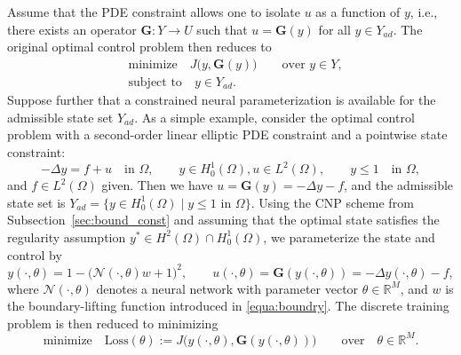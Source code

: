 \documentclass{article}
\numberwithin{equation}{section}
\begin{document}
Assume that the PDE constraint allows one to isolate $u$ as a function of $y$, i.e., there exists an operator $\mathbf{G}:Y\to U$ such that $u=\mathbf{G}(y)$ for all $y\in Y_{ad}$.
The original optimal control problem then reduces to
\begin{align*}
    &\text{minimize}\quad J\bigl(y,\mathbf{G}(y)\bigr)\qquad \text{over } y\in Y,\\
    &\text{subject to}\quad y\in Y_{ad}. 
\end{align*}
Suppose further that a constrained neural parameterization is available for the admissible state set $Y_{ad}$. As a simple example, consider the optimal control problem with a second-order linear elliptic PDE constraint and a pointwise state constraint:
\begin{equation}
    -\Delta y=f+u
    \quad \text{in }\Omega,
    \qquad
    y\in H^1_0(\Omega), u\in L^2(\Omega)
    ,
    \qquad
    y\le 1
    \quad \text{in }\Omega,
\end{equation}
and $f\in L^2(\Omega)$ given. Then we have $u=\mathbf{G}(y)=-\Delta y - f$,
and the admissible state set is $Y_{ad}=\{y\in H_0^1(\Omega)\mid y\le 1 \text{ in }\Omega\}$. Using the CNP scheme from Subsection~\ref{sec:bound_const} and assuming that the optimal state satisfies the regularity assumption $y^*\in H^2(\Omega)\cap H_0^1(\Omega)$, we parameterize the state and control by
\begin{equation*}
    y(\cdot,\theta)=1-\bigl(\mathcal N(\cdot,\theta)w+1\bigr)^2,
    \qquad
    u(\cdot,\theta)=\mathbf{G}(y(\cdot,\theta))=-\Delta y(\cdot,\theta)-f,
\end{equation*}
where $\mathcal N(\cdot,\theta)$ denotes a neural network with parameter vector $\theta\in \mathbb{R}^M$, and $w$ is the boundary-lifting function introduced in \eqref{equa:boundry}. The  discrete training problem is then reduced to minimizing
\begin{equation}
    \text{minimize}\quad\mathrm{Loss}(\theta):=J\bigl(y(\cdot,\theta),\mathbf{G}(y(\cdot,\theta))\bigr)\qquad\text{over}\quad\theta \in\mathbb{R}^M.
\end{equation}
\end{document}
